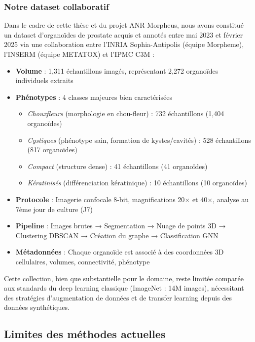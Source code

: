 \subsubsection{Notre dataset collaboratif}

Dans le cadre de cette thèse et du projet ANR Morpheus, nous avons constitué un dataset d'organoïdes de prostate acquis et annotés entre mai 2023 et février 2025 via une collaboration entre l'INRIA Sophia-Antipolis (équipe Morpheme), l'INSERM (équipe METATOX) et l'IPMC C3M :

\begin{itemize}
    \item \textbf{Volume} : 1,311 échantillons imagés, représentant 2,272 organoïdes individuels extraits
    \item \textbf{Phénotypes} : 4 classes majeures bien caractérisées
        \begin{itemize}
            \item \textit{Chouxfleurs} (morphologie en chou-fleur) : 732 échantillons (1,404 organoïdes)
            \item \textit{Cystiques} (phénotype sain, formation de kystes/cavités) : 528 échantillons (817 organoïdes)
            \item \textit{Compact} (structure dense) : 41 échantillons (41 organoïdes)
            \item \textit{Kératinisés} (différenciation kératinique) : 10 échantillons (10 organoïdes)
        \end{itemize}
    \item \textbf{Protocole} : Imagerie confocale 8-bit, magnifications 20× et 40×, analyse au 7ème jour de culture (J7)
    \item \textbf{Pipeline} : Images brutes → Segmentation → Nuage de points 3D → Clustering DBSCAN → Création du graphe → Classification GNN
    \item \textbf{Métadonnées} : Chaque organoïde est associé à des coordonnées 3D cellulaires, volumes, connectivité, phénotype
\end{itemize}

Cette collection, bien que substantielle pour le domaine, reste limitée comparée aux standards du deep learning classique (ImageNet : 14M images), nécessitant des stratégies d'augmentation de données et de transfer learning depuis des données synthétiques.

\subsection{Limites des méthodes actuelles}

